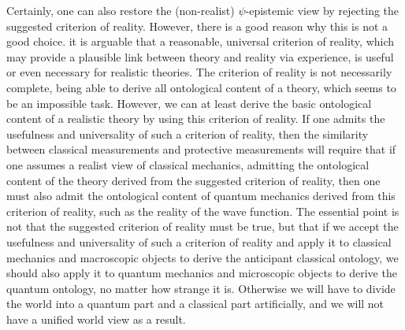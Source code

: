 Certainly, one can also restore the (non-realist) $\psi$-epistemic view by rejecting the suggested criterion of reality. However, there is a good reason why this is not a good choice. it is arguable that a reasonable, universal criterion of reality, which may provide a plausible link between theory and reality via experience, is useful or even necessary for realistic theories. The criterion of reality is not necessarily complete, being able to derive all ontological content of a theory, which seems to be an impossible task. However, we can at least derive the basic ontological content of a realistic theory by using this criterion of reality. If one admits the usefulness and universality of such a criterion of reality, then the similarity between classical measurements and protective measurements will require that if one assumes a realist view of classical mechanics, admitting the ontological content of the theory derived from the suggested criterion of reality, then one must also admit the ontological content of quantum mechanics derived from this criterion of reality, such as the reality of the wave function. The essential point is not that the suggested criterion of reality must be true, but that if we accept the usefulness and universality of such a  criterion of reality and apply it to classical mechanics and macroscopic objects to derive the anticipant classical ontology, we should also apply it to quantum mechanics and microscopic objects to derive the quantum ontology, no matter how strange it is. Otherwise we will have to divide the world into a quantum part and a classical part artificially, and we will not have a unified world view as a result.



